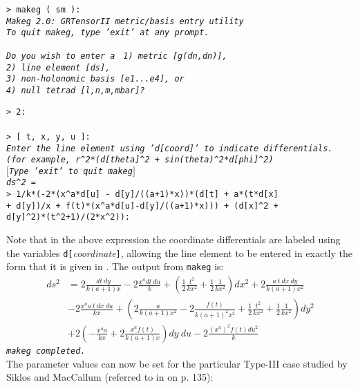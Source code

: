 \documentclass{article}
\begin{document}
{\noindent\texttt{> makeg ( sm ):\\
\indent\textsl{\small Makeg 2.0: GRTensorII metric/basis entry utility\\
\indent To quit makeg, type 'exit' at any prompt.}}
\begin{tabbing}
\indent\texttt{\textsl{Do you wish to enter a }}
  \= \texttt{\textsl{1) metric [g(dn,dn)],}}\\
  \> \texttt{\textsl{2) line element [ds],}}\\
  \> \texttt{\textsl{3) non-holonomic basis [e1...e4], or}}\\
  \> \texttt{\textsl{4) null tetrad [l,n,m,mbar]?}}
\end{tabbing}
\texttt{> 2:\\
\\
> [ t, x, y, u ]:}\\

\texttt{\textsl{{\small Enter the line element using 'd[coord]' to indicate
  differentials.\\
\indent (for example,  r\^{}2*(d[theta]\^{}2 + sin(theta)\^{}2*d[phi]\^{}2)\\
\indent $[$Type 'exit' to quit makeg$]$\\
\indent  ds\^{}2 = }}}\\

\noindent\texttt{> 1/k*(-2*(x\^{}a*d[u] - d[y]/((a+1)*x))*(d[t]
  + a*(t*d[x] \\
\indent + d[y])/x + f(t)*(x\^{}a*d[u]-d[y]/((a+1)*x))) + (d[x]\^{}2 +\\
\indent d[y]\^{}2)*(t\^{}2+1)/(2*x\^{}2)):\\
}

\noindent Note that in the above expression the coordinate differentials
are labeled using the variables {\tt d[}{\em coordinate}{\tt ]},
allowing the line element to be entered in exactly the form that it is
given in \cite{krameretal}. The output from {\tt makeg} is:
\begin{align*}
  ds^2 & = 2\frac{dt\ dy}{k(a+1)x} - 2\frac{x^a dt\ du}{k}
    + \left(\frac{1}{2}\frac{t^2}{kx^2} + 
    \frac{1}{2}\frac{1}{kx^2}\right) dx^2
    + 2\frac{a\ t\ dx\ dy}{k(a+1)x^2}\\
  & - 2\frac{x^a a\ t\ dx\ du}{kx} + \left( 2\frac{a}{k(a+1)x^2}
    - 2\frac{f(t)}{k(a+1)^2 x^2} + \frac{1}{2}\frac{t^2}{kx^2} +
    \frac{1}{2}\frac{1}{kx^2}\right)dy^2\\
  & + 2\left(-\frac{x^a a}{kx} + 2\frac{x^a f(t)}{k(a+1)x}\right)dy\ du
    - 2\frac{(x^a)^2 f(t) du^2}{k}
\end{align*}
\indent\texttt{\textsl{\small makeg completed.}}\\
The parameter values can now be set for the particular Type-III case
studied by Siklos and MacCallum \cite{maccallum/siklos:1981} (referred
to in \cite{krameretal} on p. 135):\\

}
\end{document}
